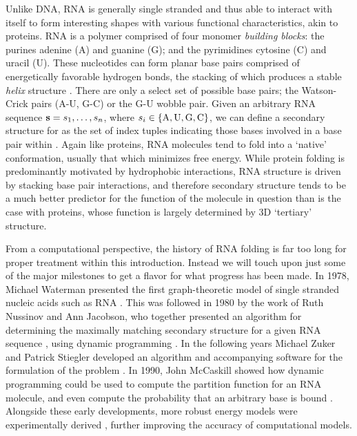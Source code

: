 Unlike DNA, RNA is generally single stranded and thus able to interact with itself
to form interesting shapes with various functional characteristics, akin to
proteins. RNA is a polymer comprised of four monomer {\em building blocks}:
the purines
adenine (A) and guanine (G); and the pyrimidines cytosine (C) and uracil (U). These
nucleotides can form planar base pairs comprised of energetically favorable
hydrogen bonds, the stacking of which produces a stable {\em helix} structure
\citep{yakovchuk:2006bm}. There are only a select set of possible base pairs; the
Watson-Crick pairs (A-U, G-C) or the G-U wobble pair. Given an arbitrary RNA
sequence ${\bf s} = s_1,\dots,s_n$, where $s_i \in \{\text{A,\,U,\,G,\,C}\}$, we can define
a secondary structure \str for \seq as the set of index tuples indicating those
bases involved in a base pair within \seq. Again like proteins, RNA molecules tend
to fold into a `native' conformation, usually that which minimizes free energy.
While protein folding is predominantly motivated by hydrophobic
interactions, RNA structure is driven by stacking base pair interactions, and
therefore secondary structure tends to be a much better predictor for the function
of the molecule in question than is the case with proteins, whose function is
largely determined by 3D `tertiary' structure.

From a computational perspective, the history of RNA folding is far too long for
proper treatment within this introduction. Instead we will touch upon just some
of the major milestones to get a flavor for what progress has been made. In 1978,
Michael Waterman presented the first graph-theoretic model of single stranded
nucleic acids such as RNA \citep{waterman:1978va}. This was followed in 1980 by
the work of Ruth Nussinov and Ann Jacobson, who together presented an algorithm for
determining the maximally matching secondary structure \str for
a given RNA sequence \citep{nussinov1980}, using dynamic programming
\citep{bellman:1952vza}. In the following years Michael Zuker and Patrick Stiegler
developed an algorithm and accompanying software for the \mfe
formulation of the problem \citep{zuker:1981tf,zuker:1989im}. In 1990, John
McCaskill showed how dynamic programming could be used to compute the
partition function for an RNA molecule, and even compute the probability that an
arbitrary base is bound \citep{mccaskill}. Alongside these early developments,
more robust energy models were experimentally derived \citep{turner,turner:2009vy},
further improving the accuracy of computational models.

